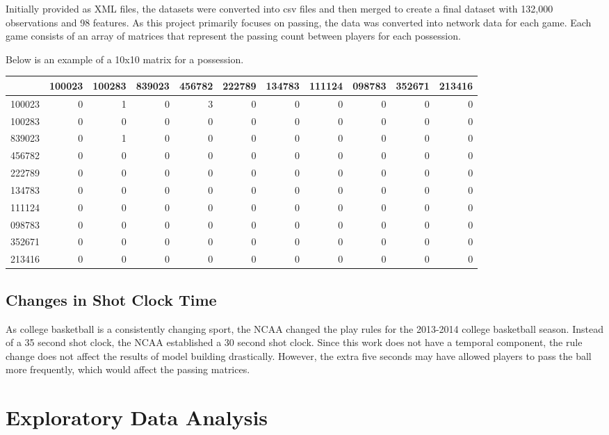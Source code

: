 \documentclass[12pt,twoside]{dukestatscithesis}
\theoremstyle{definition}
\theoremstyle{definition}
\theoremstyle{definition}
\theoremstyle{remark}
\begin{document}
Initially provided as XML files, the datasets were converted into csv
files and then merged to create a final dataset with 132,000
observations and 98 features. As this project primarily focuses on
passing, the data was converted into network data for each game. Each
game consists of an array of matrices that represent the passing count
between players for each possession.

Below is an example of a 10x10 matrix for a possession.
\begin{tabular}{l|r|r|r|r|r|r|r|r|r|r}
\hline
  & 100023 & 100283 & 839023 & 456782 & 222789 & 134783 & 111124 & 098783 & 352671 & 213416\\
\hline
100023 & 0 & 1 & 0 & 3 & 0 & 0 & 0 & 0 & 0 & 0\\
\hline
100283 & 0 & 0 & 0 & 0 & 0 & 0 & 0 & 0 & 0 & 0\\
\hline
839023 & 0 & 1 & 0 & 0 & 0 & 0 & 0 & 0 & 0 & 0\\
\hline
456782 & 0 & 0 & 0 & 0 & 0 & 0 & 0 & 0 & 0 & 0\\
\hline
222789 & 0 & 0 & 0 & 0 & 0 & 0 & 0 & 0 & 0 & 0\\
\hline
134783 & 0 & 0 & 0 & 0 & 0 & 0 & 0 & 0 & 0 & 0\\
\hline
111124 & 0 & 0 & 0 & 0 & 0 & 0 & 0 & 0 & 0 & 0\\
\hline
098783 & 0 & 0 & 0 & 0 & 0 & 0 & 0 & 0 & 0 & 0\\
\hline
352671 & 0 & 0 & 0 & 0 & 0 & 0 & 0 & 0 & 0 & 0\\
\hline
213416 & 0 & 0 & 0 & 0 & 0 & 0 & 0 & 0 & 0 & 0\\
\hline
\end{tabular}
\section{Changes in Shot Clock Time}\label{changes-in-shot-clock-time}

As college basketball is a consistently changing sport, the NCAA changed
the play rules for the 2013-2014 college basketball season. Instead of a
35 second shot clock, the NCAA established a 30 second shot clock. Since
this work does not have a temporal component, the rule change does not
affect the results of model building drastically. However, the extra
five seconds may have allowed players to pass the ball more frequently,
which would affect the passing matrices.

\chapter{Exploratory Data Analysis}\label{exploratory-data-analysis}
\end{document}
